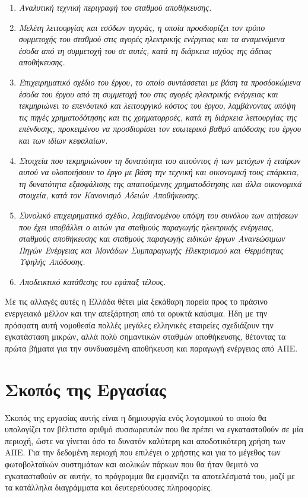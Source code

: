 \documentclass[12pt]{report}
\begin{document}
\begin{enumerate}[label=\roman*.]
	\item {\textit{Αναλυτική τεχνική περιγραφή του σταθμού αποθήκευσης.}}
	\item {\textit{Μελέτη λειτουργίας και εσόδων αγοράς, η οποία προσδιορίζει τον τρόπο συμμετοχής του σταθμού στις αγορές ηλεκτρικής ενέργειας και τα αναμενόμενα έσοδα από τη συμμετοχή του σε αυτές, 
				κατά τη διάρκεια ισχύος της άδειας αποθήκευσης.}}
	\item {\textit{Επιχειρηματικό σχέδιο του έργου, το οποίο συντάσσεται με βάση τα προσδοκώμενα έσοδα του έργου από τη συμμετοχή του στις αγορές ηλεκτρικής ενέργειας και τεκμηριώνει το επενδυτικό και λειτουργικό κόστος του έργου, 
				λαμβάνοντας υπόψη τις πηγές χρηματοδότησης και τις χρηματορροές, κατά τη διάρκεια λειτουργίας της επένδυσης, προκειμένου να προσδιορίσει τον εσωτερικό βαθμό απόδοσης του έργου και των ιδίων κεφαλαίων.}}
	\item {\textit{Στοιχεία που τεκμηριώνουν τη δυνατότητα του αιτούντος ή των μετόχων ή εταίρων αυτού να υλοποιήσουν το έργο με βάση την τεχνική και οικονομική τους επάρκεια, τη δυνατότητα εξασφάλισης της απαιτούμενης χρηματοδότησης 
				και άλλα οικονομικά στοιχεία, κατά τον Κανονισμό Αδειών Αποθήκευσης.}}
	\item {\textit{Συνολικό επιχειρηματικό σχέδιο, λαμβανομένου υπόψη του συνόλου των αιτήσεων που έχει υποβάλλει ο αιτών για σταθμούς παραγωγής ηλεκτρικής ενέργειας, σταθμούς αποθήκευσης και σταθμούς παραγωγής ειδικών έργων 
				Ανανεώσιμων Πηγών Ενέργειας και Μονάδων Συμπαραγωγής Ηλεκτρισμού και Θερμότητας Υψηλής Απόδοσης.}}
	\item {\textit{Αποδεικτικό κατάθεσης του εφάπαξ τέλους.}}
\end{enumerate}

Με τις αλλαγές αυτές η Ελλάδα θέτει μία ξεκάθαρη πορεία προς το πράσινο ενεργειακό μέλλον και την απεξάρτηση από τα ορυκτά καύσιμα. Ήδη με την
πρόσφατη αυτή νομοθεσία πολλές μεγάλες ελληνικές εταιρείες σχεδιάζουν την εγκατάσταση μικρών, αλλά πολύ σημαντικών σταθμών αποθήκευσης, θέτοντας τα πρώτα βήματα για την συνδυασμένη αποθήκευση και παραγωγή ενέργειας από ΑΠΕ.

\chapter*{Σκοπός της Εργασίας}
Σκοπός της εργασίας αυτής είναι η δημιουργία ενός λογισμικού το οποίο θα υπολογίζει τον βέλτιστο αριθμό συσσωρευτών που θα πρέπει να εγκατασταθούν σε μία περιοχή, ώστε να γίνεται όσο το δυνατόν καλύτερη και 
αποδοτικότερη χρήση των ΑΠΕ. Για την δεδομένη περιοχή που επιλέγει ο χρήστης και για το μέγεθος των φωτοβολταϊκών συστημάτων και αιολικών πάρκων που θα ήταν θεμιτό να εγκατασταθούν σε αυτήν, το πρόγραμμα θα εμφανίζει τα
αποτελέσματά του, μαζί με τα κατάλληλα διαγράμματα και δευτερεύουσες πληροφορίες.
\end{document}
